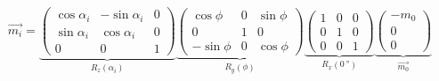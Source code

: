 \begin{equation}
	\vec{m_i}  = \underbrace{\begin{pmatrix}
								\cos\alpha_i & -\sin\alpha_i & 0 \\
								\sin\alpha_i &  \cos\alpha_i & 0 \\
								0			 & 0			 & 1
				 			\end{pmatrix}}_{R_z(\alpha_i)}
				 \underbrace{\begin{pmatrix}
				    			\cos\phi & 0 & \sin\phi \\
				    			0 		 & 1 & 0 \\
				   				-\sin\phi & 0 & \cos\phi
				 			\end{pmatrix}}_{R_y(\phi)}
				 \underbrace{\begin{pmatrix}
				 				1  & 0 & 0 \\
				 				0  & 1 & 0 \\
				    			0 &  0 & 1
				 			\end{pmatrix}}_{R_x(\SI{0}{\degree})}
				 \underbrace{\begin{pmatrix} -m_0\\0\\0 \end{pmatrix}}_{\vec{m_0}}
\end{equation}



\clearpage